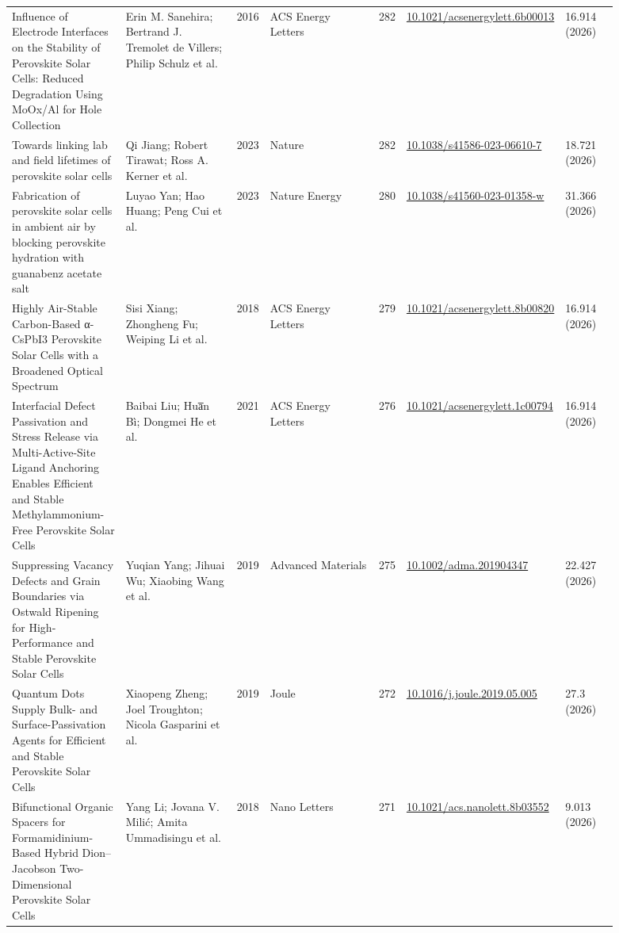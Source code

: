 \documentclass[10pt,a4paper]{article}
\begin{document}
{\begin{longtable}{p{0.197\linewidth}p{0.197\linewidth}p{0.043\linewidth}p{0.197\linewidth}p{0.043\linewidth}p{0.117\linewidth}p{0.098\linewidth}}
Influence of Electrode Interfaces on the Stability of Perovskite Solar Cells: Reduced Degradation Using MoOx/Al for Hole Collection & Erin M. Sanehira; Bertrand J. Tremolet de Villers; Philip Schulz et al. & 2016 & ACS Energy Letters & 282 & \href{https://doi.org/10.1021/acsenergylett.6b00013}{10.1021/acsenergylett.6b00013} & 16.914 (2026) \\
Towards linking lab and field lifetimes of perovskite solar cells & Qi Jiang; Robert Tirawat; Ross A. Kerner et al. & 2023 & Nature & 282 & \href{https://doi.org/10.1038/s41586-023-06610-7}{10.1038/s41586-023-06610-7} & 18.721 (2026) \\
Fabrication of perovskite solar cells in ambient air by blocking perovskite hydration with guanabenz acetate salt & Luyao Yan; Hao Huang; Peng Cui et al. & 2023 & Nature Energy & 280 & \href{https://doi.org/10.1038/s41560-023-01358-w}{10.1038/s41560-023-01358-w} & 31.366 (2026) \\
Highly Air-Stable Carbon-Based α-CsPbI3 Perovskite Solar Cells with a Broadened Optical Spectrum & Sisi Xiang; Zhongheng Fu; Weiping Li et al. & 2018 & ACS Energy Letters & 279 & \href{https://doi.org/10.1021/acsenergylett.8b00820}{10.1021/acsenergylett.8b00820} & 16.914 (2026) \\
Interfacial Defect Passivation and Stress Release via Multi-Active-Site Ligand Anchoring Enables Efficient and Stable Methylammonium-Free Perovskite Solar Cells & Baibai Liu; Hua̅n Bì; Dongmei He et al. & 2021 & ACS Energy Letters & 276 & \href{https://doi.org/10.1021/acsenergylett.1c00794}{10.1021/acsenergylett.1c00794} & 16.914 (2026) \\
Suppressing Vacancy Defects and Grain Boundaries via Ostwald Ripening for High‐Performance and Stable Perovskite Solar Cells & Yuqian Yang; Jihuai Wu; Xiaobing Wang et al. & 2019 & Advanced Materials & 275 & \href{https://doi.org/10.1002/adma.201904347}{10.1002/adma.201904347} & 22.427 (2026) \\
Quantum Dots Supply Bulk- and Surface-Passivation Agents for Efficient and Stable Perovskite Solar Cells & Xiaopeng Zheng; Joel Troughton; Nicola Gasparini et al. & 2019 & Joule & 272 & \href{https://doi.org/10.1016/j.joule.2019.05.005}{10.1016/j.joule.2019.05.005} & 27.3 (2026) \\
Bifunctional Organic Spacers for Formamidinium-Based Hybrid Dion–Jacobson Two-Dimensional Perovskite Solar Cells & Yang Li; Jovana V. Milić; Amita Ummadisingu et al. & 2018 & Nano Letters & 271 & \href{https://doi.org/10.1021/acs.nanolett.8b03552}{10.1021/acs.nanolett.8b03552} & 9.013 (2026) \\

\end{longtable}}
\end{document}
